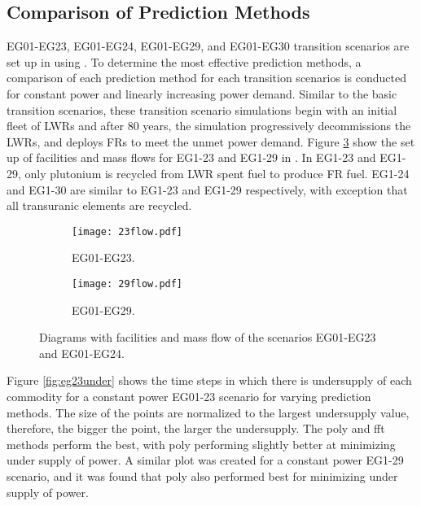 \subsection{Comparison of Prediction Methods}

EG01-EG23, EG01-EG24, EG01-EG29, and EG01-EG30 transition scenarios
are set up in \Cyclus using \deploy. 
To determine the most effective \deploy prediction methods, a
comparison of each prediction method for each 
transition scenarios is conducted for constant power 
and linearly increasing power demand. 
Similar to the basic transition scenarios, these transition scenario 
simulations begin with an initial fleet of \glspl{LWR} and after 
80 years, the simulation progressively decommissions the \glspl{LWR}, 
and \deploy deploys \glspl{FR} to meet the unmet power demand. 
Figure \ref{fig:eg2329}
show the set up of facilities and mass flows for 
EG1-23 and EG1-29 in \Cyclus. 
In EG1-23 and EG1-29, only plutonium is recycled from \gls{LWR}
spent fuel to produce \gls{FR} fuel. 
EG1-24 and EG1-30 are similar to EG1-23 and EG1-29 respectively,
with exception that all transuranic elements are recycled.  

\begin{figure}[]
	\centering
	\begin{subfigure}[t]{\textwidth}
		\centering
		\texttt{[image: 23flow.pdf]} 
		\caption{EG01-EG23.}
		\label{fig:23flow}
	\end{subfigure}
	\vspace{1cm}
	\begin{subfigure}[t]{\textwidth}
		\centering
		\texttt{[image: 29flow.pdf]} 
		\caption{EG01-EG29.}
		\label{fig:29flow}
	\end{subfigure}
	\hfill
	\caption{Diagrams with facilities and mass flow of the scenarios EG01-EG23 and EG01-EG24.}
	\label{fig:eg2329}
\end{figure}

Figure \ref{fig:eg23under} shows the time steps in which there is undersupply 
of each commodity for a constant power EG01-23 scenario for varying 
prediction methods.
The size of the points are normalized to the largest undersupply
value, therefore, the bigger the point, the larger the undersupply. 
The poly and fft methods perform the best, with poly performing slightly 
better at minimizing under supply of power.
A similar plot was created for a constant power EG1-29 scenario, and 
it was found that poly also performed best for minimizing under supply 
of power.  

